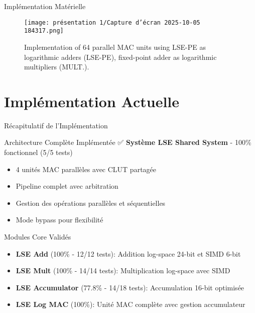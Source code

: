 \documentclass[aspectratio=169]{beamer}
\begin{document}
\begin{frame}{Implémentation Matérielle}

\begin{figure}
    \centering
    \texttt{[image: présentation 1/Capture d'écran 2025-10-05 184317.png]}
    \caption{Implementation of 64 parallel MAC units using
LSE-PE as logarithmic adders (LSE-PE), fixed-point adder as
logarithmic multipliers (MULT.).}
    \label{fig:enter-label}
\end{figure}
    
\end{frame}

\section{Implémentation Actuelle}

\begin{frame}{Récapitulatif de l'Implémentation}
\begin{block}{Architecture Complète Implémentée ✅}
\textbf{Système LSE Shared System} - 100\% fonctionnel (5/5 tests)
\begin{itemize}
\item 4 unités MAC parallèles avec CLUT partagée
\item Pipeline complet avec arbitration
\item Gestion des opérations parallèles et séquentielles
\item Mode bypass pour flexibilité
\end{itemize}
\end{block}

\begin{block}{Modules Core Validés}
\begin{itemize}
\item \textbf{LSE Add} (100\% - 12/12 tests): Addition log-space 24-bit et SIMD 6-bit
\item \textbf{LSE Mult} (100\% - 14/14 tests): Multiplication log-space avec SIMD
\item \textbf{LSE Accumulator} (77.8\% - 14/18 tests): Accumulation 16-bit optimisée
\item \textbf{LSE Log MAC} (100\%): Unité MAC complète avec gestion accumulateur
\end{itemize}
\end{block}
\end{frame}
\end{document}
